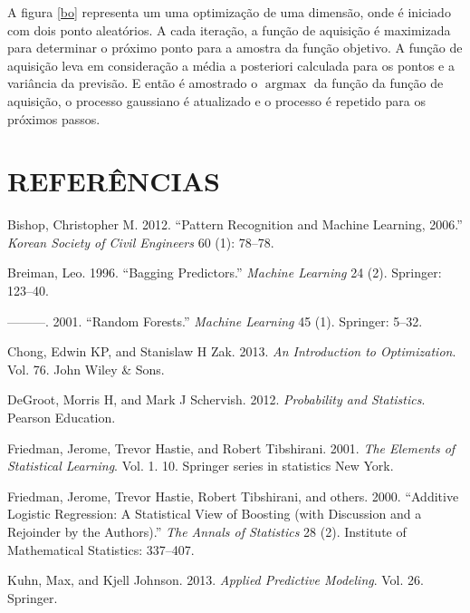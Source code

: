 \documentclass[
	12pt,				%
	a4paper,		%
	oneside,    %
	chapter=TITLE,		   %
	section=TITLE,		   %
	subsection=TITLE,	   %
	subsubsection=TITLE, %
	english,			%
	french,				%
	spanish,			%
	brazil,				%
]{abntex2}
\begin{document}
A figura \ref{bo} representa um uma optimização de uma dimensão, onde é
iniciado com dois ponto aleatórios. A cada iteração, a função de
aquisição é maximizada para determinar o próximo ponto para a amostra da
função objetivo. A função de aquisição leva em consideração a média a
posteriori calculada para os pontos e a variância da previsão. E então é
amostrado o \(\operatorname{argmax}\) da função da função de aquisição,
o processo gaussiano é atualizado e o processo é repetido para os
próximos passos.

\newpage

\hypertarget{referuxeancias}{%
\chapter*{REFERÊNCIAS}\label{referuxeancias}}

\hypertarget{refs}{}
\leavevmode\hypertarget{ref-bishop2012pattern}{}%
Bishop, Christopher M. 2012. ``Pattern Recognition and Machine Learning,
2006.'' \emph{Korean Society of Civil Engineers} 60 (1): 78--78.

\leavevmode\hypertarget{ref-breiman1996bagging}{}%
Breiman, Leo. 1996. ``Bagging Predictors.'' \emph{Machine Learning} 24
(2). Springer: 123--40.

\leavevmode\hypertarget{ref-breiman2001random}{}%
---------. 2001. ``Random Forests.'' \emph{Machine Learning} 45 (1).
Springer: 5--32.

\leavevmode\hypertarget{ref-chong2013introduction}{}%
Chong, Edwin KP, and Stanislaw H Zak. 2013. \emph{An Introduction to
Optimization}. Vol. 76. John Wiley \& Sons.

\leavevmode\hypertarget{ref-degroot2012probability}{}%
DeGroot, Morris H, and Mark J Schervish. 2012. \emph{Probability and
Statistics}. Pearson Education.

\leavevmode\hypertarget{ref-friedman2001elements}{}%
Friedman, Jerome, Trevor Hastie, and Robert Tibshirani. 2001. \emph{The
Elements of Statistical Learning}. Vol. 1. 10. Springer series in
statistics New York.

\leavevmode\hypertarget{ref-friedman2000additive}{}%
Friedman, Jerome, Trevor Hastie, Robert Tibshirani, and others. 2000.
``Additive Logistic Regression: A Statistical View of Boosting (with
Discussion and a Rejoinder by the Authors).'' \emph{The Annals of
Statistics} 28 (2). Institute of Mathematical Statistics: 337--407.

\leavevmode\hypertarget{ref-kuhn2013applied}{}%
Kuhn, Max, and Kjell Johnson. 2013. \emph{Applied Predictive Modeling}.
Vol. 26. Springer.
\end{document}
